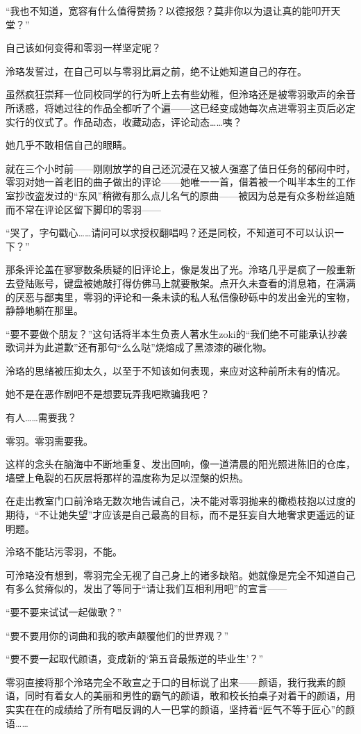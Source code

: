 \documentclass[UTF8, scheme = chinese, openany]{ctexbook}
\begin{document}
“我也不知道，宽容有什么值得赞扬？以德报怨？莫非你以为退让真的能叩开天堂？”

自己该如何变得和零羽一样坚定呢？

泠珞发誓过，在自己可以与零羽比肩之前，绝不让她知道自己的存在。

虽然疯狂崇拜一位同校同学的行为听上去有些幼稚，但泠珞还是被零羽歌声的余音所诱惑，将她过往的作品全都听了个遍——这已经变成她每次点进零羽主页后必定实行的仪式了。作品动态，收藏动态，评论动态……咦？

她几乎不敢相信自己的眼睛。

就在三个小时前——刚刚放学的自己还沉浸在又被人强塞了值日任务的郁闷中时，零羽对她一首老旧的曲子做出的评论——她唯一一首，借着被一个叫半本生的工作室抄改盗发过的“东风”稍微有那么点儿名气的原曲——被因为总是有众多粉丝追随而不常在评论区留下脚印的零羽——

“哭了，字句戳心……请问可以求授权翻唱吗？还是同校，不知道可不可以认识一下？”

那条评论盖在寥寥数条质疑的旧评论上，像是发出了光。泠珞几乎是疯了一般重新去登陆账号，键盘被她敲打得仿佛马上就要散架。点开久未查看的消息箱，在满满的厌恶与鄙夷里，零羽的评论和一条未读的私人私信像砂砾中的发出金光的宝物，静静地躺在那里。

“要不要做个朋友？”这句话将半本生负责人著水生zoki的“我们绝不可能承认抄袭歌词并为此道歉”还有那句“么么哒”烧熔成了黑漆漆的碳化物。

泠珞的思绪被压抑太久，以至于不知该如何表现，来应对这种前所未有的情况。

她不是在恶作剧吧不是想要玩弄我吧欺骗我吧？

有人……需要我？

零羽。零羽需要我。

这样的念头在脑海中不断地重复、发出回响，像一道清晨的阳光照进陈旧的仓库，墙壁上龟裂的石灰层将那样的温度称为足以涅槃的炽热。

在走出教室门口前泠珞无数次地告诫自己，决不能对零羽抛来的橄榄枝抱以过度的期待，“不让她失望”才应该是自己最高的目标，而不是狂妄自大地奢求更遥远的证明题。

泠珞不能玷污零羽，不能。

可泠珞没有想到，零羽完全无视了自己身上的诸多缺陷。她就像是完全不知道自己有多么贫瘠似的，发出了等同于“请让我们互相利用吧”的宣言——

“要不要来试试一起做歌？”

“要不要用你的词曲和我的歌声颠覆他们的世界观？”

“要不要一起取代颜语，变成新的‘第五音最叛逆的毕业生’？”

零羽直接将那个泠珞完全不敢宣之于口的目标说了出来——颜语，我行我素的颜语，同时有着女人的美丽和男性的霸气的颜语，敢和校长拍桌子对着干的颜语，用实实在在的成绩给了所有唱反调的人一巴掌的颜语，坚持着“匠气不等于匠心”的颜语……
\end{document}
